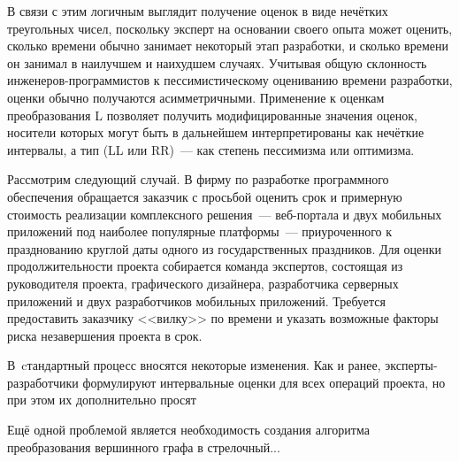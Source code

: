 В связи с этим логичным выглядит получение оценок в виде нечётких треугольных чисел, поскольку эксперт на основании своего опыта может оценить, сколько времени обычно занимает некоторый этап разработки, и сколько времени он занимал в наилучшем и наихудшем случаях. Учитывая общую склонность инженеров-программистов к пессимистическому оцениванию времени разработки, оценки обычно получаются асимметричными. Применение к оценкам преобразования L позволяет получить модифицированные значения оценок, носители которых могут быть в дальнейшем интерпретированы как нечёткие интервалы, а тип (LL или RR)~--- как степень пессимизма или оптимизма. 

Рассмотрим следующий случай. В фирму по разработке программного обеспечения обращается заказчик с просьбой оценить срок и примерную стоимость реализации комплексного решения~--- веб-портала и двух мобильных приложений под наиболее популярные платформы~--- приуроченного к празднованию круглой даты одного из государственных праздников. Для оценки продолжительности проекта собирается команда экспертов, состоящая из руководителя проекта, графического дизайнера, разработчика серверных приложений и двух разработчиков мобильных приложений. Требуется предоставить заказчику <<вилку>> по времени и указать возможные факторы риска незавершения проекта в срок.

В~cтандартный процесс вносятся некоторые изменения. Как и ранее, эксперты-разработчики формулируют интервальные оценки для всех операций проекта, но при этом их дополнительно просят 


Ещё одной проблемой является необходимость создания алгоритма преобразования вершинного графа в стрелочный...